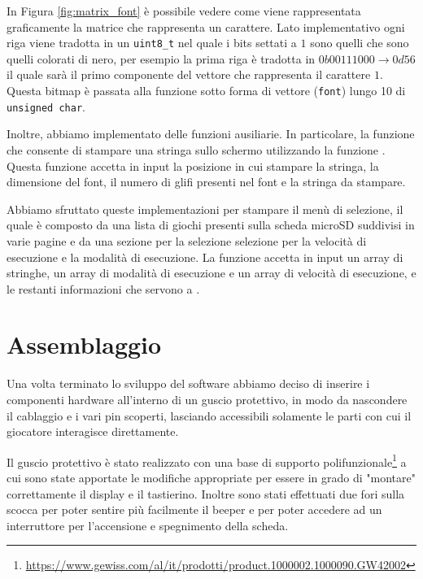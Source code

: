 \documentclass[a4paper]{article}
\begin{document}
In Figura \ref{fig:matrix_font} è possibile vedere come viene rappresentata graficamente
la matrice che rappresenta un carattere. Lato implementativo ogni riga viene tradotta in
un \texttt{uint8\_t} nel quale i bits settati a $1$ sono quelli che sono quelli colorati di nero,
per esempio la prima riga è tradotta in $0b00111000 \rightarrow 0d56$ il quale sarà il primo
componente del vettore che rappresenta il carattere $1$. Questa bitmap è passata alla
funzione
{}
sotto forma di vettore (\texttt{font}) lungo 10 di \texttt{unsigned char}.

Inoltre, abbiamo implementato delle funzioni ausiliarie. In particolare, la funzione
{}
che consente di stampare una stringa sullo schermo utilizzando la funzione
{}. Questa funzione accetta in input
la posizione in cui stampare la stringa, la dimensione del font, il numero di glifi presenti
nel font e la stringa da stampare.

Abbiamo sfruttato queste implementazioni per stampare il menù di selezione, il quale
è composto da una lista di giochi presenti sulla scheda microSD suddivisi in varie pagine
e da una sezione per la selezione selezione per la velocità di esecuzione e la modalità
di esecuzione. La funzione accetta in input un array di stringhe, un array di modalità di
esecuzione e un array di velocità di esecuzione, e le restanti informazioni che servono
a {}.

\section{Assemblaggio}

Una volta terminato lo sviluppo del software abbiamo deciso di inserire i componenti hardware
all'interno di un guscio protettivo, in modo da nascondere il cablaggio e i vari pin scoperti,
lasciando accessibili solamente le parti con cui il giocatore interagisce direttamente.

Il guscio protettivo è stato realizzato con una base di supporto
polifunzionale\footnote{\url{https://www.gewiss.com/al/it/prodotti/product.1000002.1000090.GW42002}}
a cui sono state apportate le modifiche appropriate per essere in grado di "montare" correttamente
il display e il tastierino. Inoltre sono stati effettuati due fori sulla scocca per poter sentire
più facilmente il beeper e per poter accedere ad un interruttore per l'accensione e spegnimento
della scheda.
\end{document}
